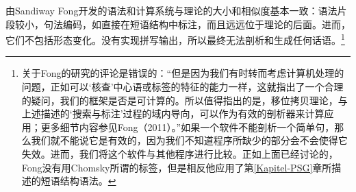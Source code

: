 由Sandiway Fong开发的语法和计算系统与理论的大小和相似度基本一致\citep{FG2012a,Fong2014a}：语法片段较小，句法编码，如直接在短语结构中标注\citep[\S~4]{FG2012a}，而且远远位于\xbarc 理论的后面。进而，它们不包括形态变化。没有实现拼写输出，所以最终无法剖析和生成任何话语。\footnote{%
 \citet*[]{BPYC2011a}关于Fong的研究的评论是错误的：“但是因为我们有时转而考虑计算机处理的问题，正如可以‘核查’中心语或标签的特征的能力一样，这就指出了一个合理的疑问，我们的框架是否是可计算的。所以值得指出的是，移位拷贝理论，与上述描述的‘搜索与标注’过程的域内导向，可以作为有效的剖析器来计算应用；更多细节内容参见Fong（2011）。”如果一个软件不能剖析一个简单句，那么我们就不能说它是有效的，因为我们不知道程序所缺少的部分会不会使得它失效。进而，我们将这个软件与其他程序进行比较。正如上面已经讨论的，Fong没有用Chomsky所谓的标签，但是相反他应用了第\ref{Kapitel-PSG}章所描述的短语结构语法。
}
